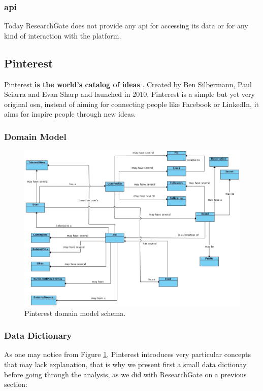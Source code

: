 \subsubsection*{\gls{api}}
Today ResearchGate does not provide any \gls{api} for accessing its data or for any kind of interaction with the platform.

\subsection{Pinterest}
Pinterest \textbf{is the world's catalog of ideas} \citep{pintabout}. Created by Ben Silbermann, Paul Sciarra and Evan Sharp and launched in 2010, Pinterest is a simple but yet very original \gls{osn}, instead of aiming for connecting people like Facebook or LinkedIn, it aims for inspire people through new ideas.

\clearpage

\subsubsection*{Domain Model}

\begin{figure}[h!]
  \hspace*{-1in}
  \includegraphics[width=1.20\textwidth]{img/pinterest-domain-model.jpg}
\caption{\label{img:pintdomain} Pinterest domain model schema.}
\end{figure}

\subsubsection*{Data Dictionary}
As one may notice from Figure \ref{img:pintdomain}, Pinterest introduces very particular concepts that may lack explanation, that is why we present first a small data dictionay before going through the analysis, as we did with ResearchGate on a previous section:


